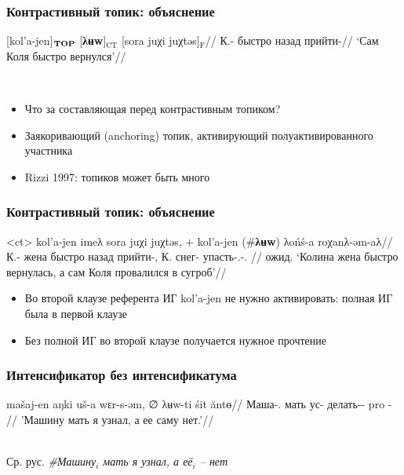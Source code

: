 \documentclass{beamer}
\begin{document}
\begin{frame}
    \frametitle{Контрастивный топик: объяснение}

    \begingl
        \gla \phantom{}[kol’a-jen]$_\text{\textbf{TOP}}$ [\textbf{λʉw}]$_\text{CT}$ [sora juχi juχtəs]$_\text{F}$//
        \glb К.-\Pssg{}  \Int{} быстро назад прийти-\Pst//
        \glft ‘Сам Коля быстро вернулся'//
    \endgl

    ~\\\begin{itemize}
        \item Что за составляющая перед контрастивным топиком?
        \pause
        \item Заякоривающий (anchoring) топик, активирующий полуактивированного участника
        \pause
        \item Rizzi 1997: топиков может быть много
    \end{itemize}

\end{frame}

\begin{frame}
    \frametitle{Контрастивный топик: объяснение}

    \ex<ct>
        \begingl
            \gla kol’a-jen imeλ sora juχi juχtəs, + kol’a-jen (\#\textbf{λʉw}) λońś-a roχanλ-əm-aλ//
            \glb К.-\Pssg{}  жена быстро назад прийти-\Pst, К. \Int{} снег-\Dat{} упасть-\Nfin.\Npst-\Poss{}.\Tsg{} //
            \glft ожид. ‘Колина жена быстро вернулась, а сам Коля провалился в сугроб’//
        \endgl
    \xe

    \begin{itemize}
        \item Во второй клаузе референта ИГ kol’a-jen не нужно активировать: полная ИГ была в первой клаузе
        \item Без полной ИГ во второй клаузе получается нужное прочтение
    \end{itemize}

\end{frame}

\begin{frame}
    \frametitle{Интенсификатор без интенсификатума}

    \ex
    \begingl
        \gla mašaj-en		aŋki	uš-a		wɛr-s-əm,	∅	λʉw-ti		śit	ăntɵ//
        \glb Маша-\Poss.\Ssg{}	мать ус-\Dat{} делать-\Pst-\Fsg{}	pro \Int{}-\Acc{}	\Dem{}	\Neg{}//
        \glft 'Машину мать я узнал, а ее саму нет.'//
    \endgl
    \xe

    ~\\Ср. рус. \textit{\#Машину$_i$ мать я узнал, а её$_i$ – нет}

\end{frame}
\end{document}
